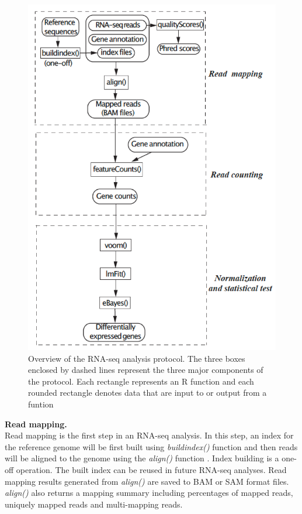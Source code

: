 \documentclass[]{book}
\begin{document}
\begin{figure}

{\centering \includegraphics[width=9.75in]{Fig1} 

}

\caption{Overview of the RNA-seq analysis protocol. The three boxes enclosed by dashed lines represent the three major components of the protocol. Each rectangle represents an R function and each rounded rectangle denotes data that are input to or output from a funtion}\label{fig:fig1}
\end{figure}

\textbf{Read mapping.}\\
Read mapping is the first step in an RNA-seq analysis. In this step, an index for the reference genome will be first built using \emph{buildindex()} function and then reads will be aligned to the genome using the \emph{align()} function \citep{Rsubread2019, liao2013subread}. Index building is a one-off operation. The built index can be reused in future RNA-seq analyses.
Read mapping results generated from \emph{align()} are saved to BAM or SAM format files. \emph{align()} also returns a mapping summary including percentages of mapped reads, uniquely mapped reads and multi-mapping reads.
\end{document}
